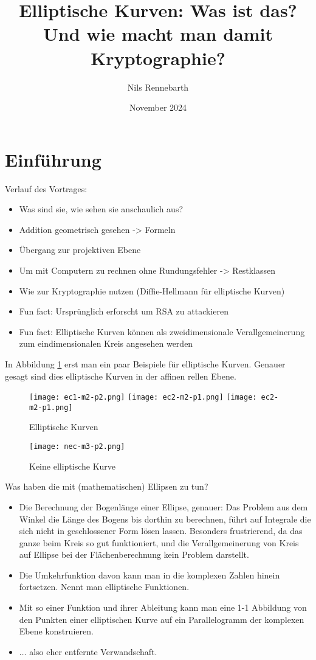 \documentclass{article}
\title{Elliptische Kurven: Was ist das? \\
  Und wie macht man damit Kryptographie?}
\author{Nils Rennebarth}
\date{November 2024}
\begin{document}
\maketitle
\section{Einführung}
Verlauf des Vortrages:

\begin{itemize}
\item
  Was sind sie, wie sehen sie anschaulich aus?
\item
  Addition geometrisch gesehen -> Formeln
\item
  Übergang zur projektiven Ebene
\item
  Um mit Computern zu rechnen ohne Rundungsfehler -> Restklassen
\item
  Wie zur Kryptographie nutzen (Diffie-Hellmann für elliptische Kurven)
\item
  Fun fact: Ursprünglich erforscht um RSA zu attackieren
\item
  Fun fact: Elliptische Kurven können als zweidimensionale
  Verallgemeinerung zum eindimensionalen Kreis angesehen werden
\end{itemize}

In Abbildung \ref{fig:ecurves} erst man ein paar Beispiele für elliptische Kurven.
Genauer gesagt sind dies elliptische Kurven in der affinen rellen Ebene.


\begin{figure}[h]
  \texttt{[image: ec1-m2-p2.png]}
  \texttt{[image: ec2-m2-p1.png]}
  \texttt{[image: ec2-m2-p1.png]}
  
  \caption{Elliptische Kurven}
  \label{fig:ecurves}
\end{figure}

\begin{figure}
  \centering
    \texttt{[image: nec-m3-p2.png]}
  \caption{Keine elliptische Kurve}
  \label{fig:noecurve}
\end{figure}

Was haben die mit (mathematischen) Ellipsen zu tun?

\begin{itemize}
\item
  Die Berechnung der Bogenlänge einer Ellipse, genauer: Das Problem aus dem
  Winkel die Länge des Bogens bis dorthin zu berechnen, führt auf Integrale
  die sich nicht in geschlossener Form lösen lassen. Besonders frustrierend,
  da das ganze beim Kreis so gut funktioniert, und die Verallgemeinerung von
  Kreis auf Ellipse bei der Flächenberechnung kein Problem darstellt.
\item
  Die Umkehrfunktion davon kann man in die komplexen Zahlen hinein
  fortsetzen. Nennt man elliptische Funktionen.
\item
  Mit so einer Funktion und ihrer Ableitung kann man eine 1-1 Abbildung
  von den Punkten einer elliptischen Kurve auf ein Parallelogramm der
  komplexen Ebene konstruieren.
\item
  $\ldots$ also eher entfernte Verwandschaft.
\end{itemize}
\end{document}
